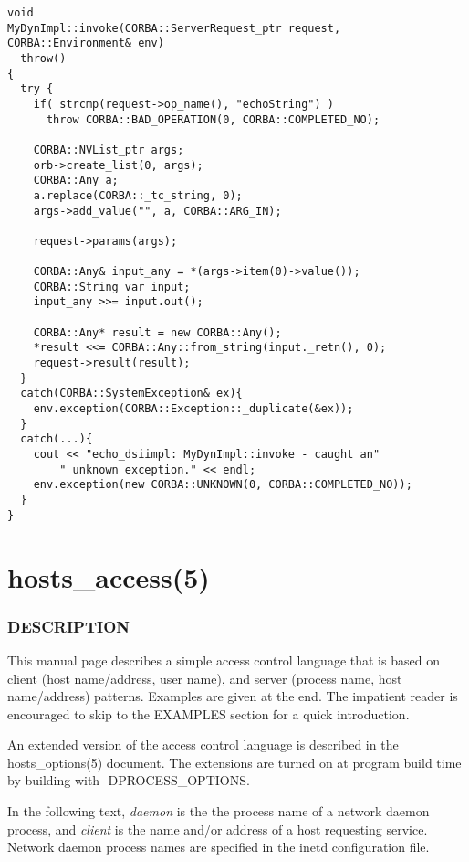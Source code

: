 \documentclass[11pt,twoside,onecolumn]{book}
\begin{document}
{\small \begin{verbatim}
void
MyDynImpl::invoke(CORBA::ServerRequest_ptr request, CORBA::Environment& env)
  throw()
{
  try {
    if( strcmp(request->op_name(), "echoString") )
      throw CORBA::BAD_OPERATION(0, CORBA::COMPLETED_NO);

    CORBA::NVList_ptr args;
    orb->create_list(0, args);
    CORBA::Any a;
    a.replace(CORBA::_tc_string, 0);
    args->add_value("", a, CORBA::ARG_IN);

    request->params(args);

    CORBA::Any& input_any = *(args->item(0)->value());
    CORBA::String_var input;
    input_any >>= input.out();

    CORBA::Any* result = new CORBA::Any();
    *result <<= CORBA::Any::from_string(input._retn(), 0);
    request->result(result);
  }
  catch(CORBA::SystemException& ex){
    env.exception(CORBA::Exception::_duplicate(&ex));
  }
  catch(...){
    cout << "echo_dsiimpl: MyDynImpl::invoke - caught an"
        " unknown exception." << endl;
    env.exception(new CORBA::UNKNOWN(0, CORBA::COMPLETED_NO));
  }
}
\end{verbatim}}



\appendix
\chapter{hosts\_access(5)}

\subsection*{DESCRIPTION}

This manual page describes a simple access control language that is
based on client (host name/address, user name), and server (process
name, host name/address) patterns.  Examples are given at the end. The
impatient reader is encouraged to skip to the EXAMPLES section for a
quick introduction.

An extended version of the access control language is described in the
hosts\_options(5) document. The extensions are turned on at
program build time by building with -DPROCESS\_OPTIONS.

In the following text, {\em daemon} is the the process name of a
network daemon process, and {\em client} is the name and/or address of
a host requesting service. Network daemon process names are specified
in the inetd configuration file.
\end{document}
